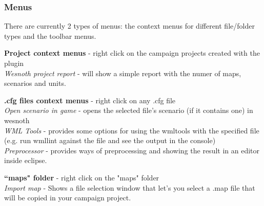 \documentclass[10pt]{article}
\begin{document}
\subsubsection{Menus}
There are currently 2 types of menus: the context menus for different file/folder types and the toolbar menus.
\begin{description}
\item{\textbf{Project context menus}} - right click on the campaign projects created with the plugin\\
   {\it Wesnoth project report} - will show a simple report with the numer of maps, scenarios and units.

\item{\textbf{.cfg files context menus}} - right click on any .cfg file\\
   {\it Open scenario in game} - opens the selected file's scenario (if it contains one) in wesnoth \\
   {\it WML Tools} - provides some options for using the wmltools with the specified file
   (e.g. run wmllint against the file and see the output in the console) \\
   {\it Preprocessor} - provides ways of preprocessing and showing the result in an editor inside eclipse.

\item{\textbf{``maps" folder}} - right click on the "maps" folder\\
   {\it Import map} - Shows a file selection window that let's you select a .map file that will be copied in your campaign project.

\end{description}
\end{document}
